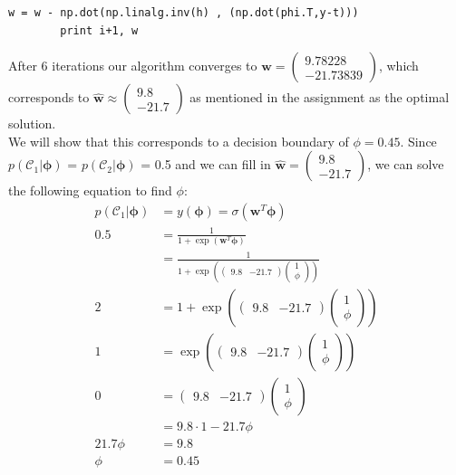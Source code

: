 \documentclass[a4paper,10pt]{article}
\numberwithin{equation}{section} %
\numberwithin{figure}{section} %
\numberwithin{table}{section} %
\theoremstyle{mytheor}
\begin{document}
\begin{enumerate}
\begin{lstlisting}[label={list:first},caption=Python code for function \textit{sigmoid(x)} and \textit{H(phi, y)} and the $main$.]
        w = w - np.dot(np.linalg.inv(h) , (np.dot(phi.T,y-t)))
        print i+1, w
    		\end{lstlisting}
		After 6 iterations our algorithm converges to $\hat{\boldsymbol{w}} = \begin{pmatrix} 9.78228 \\ -21.73839 \end{pmatrix}$, which corresponds to $\hat{\boldsymbol{w}} \approx \begin{pmatrix} 9.8 \\ -21.7 \end{pmatrix}$ as mentioned in the assignment as the optimal solution.\\
		We will show that this corresponds to a decision boundary of $\phi = 0.45$. Since $p(\mathcal{C}_1 | \boldsymbol{\phi})$ = $p(\mathcal{C}_2 | \boldsymbol{\phi})$ = 0.5 and we can fill in $\hat{\boldsymbol{w}} = \begin{pmatrix} 9.8 \\ -21.7 \end{pmatrix}$, we can solve the following equation to find $\phi$:
		\begin{align}
		p(\mathcal{C}_1 | \boldsymbol{\phi}) &= y(\boldsymbol{\phi}) = \sigma(\boldsymbol{w}^T\boldsymbol{\phi})\\
		0.5 &= \frac{1}{1 + \exp(\boldsymbol{w}^T\boldsymbol{\phi})}\\
		&= \frac{1}{1 + \exp(\begin{pmatrix} 9.8 & -21.7 \end{pmatrix} \begin{pmatrix} 1 \\ \phi \end{pmatrix})}\\
		2 &= 1 + \exp(\begin{pmatrix} 9.8 & -21.7 \end{pmatrix} \begin{pmatrix} 1 \\ \phi \end{pmatrix})\\
		1 &= \exp(\begin{pmatrix} 9.8 & -21.7 \end{pmatrix} \begin{pmatrix} 1 \\ \phi \end{pmatrix})\\
		0 &= \begin{pmatrix} 9.8 & -21.7 \end{pmatrix} \begin{pmatrix} 1 \\ \phi \end{pmatrix}\\
		&= 9.8 \cdot 1 -21.7\phi\\
		21.7\phi &= 9.8\\
		\phi &= 0.45
		\end{align} 
\end{enumerate}
\end{document}
